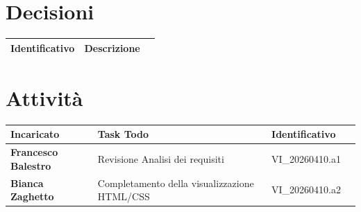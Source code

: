 \documentclass[a4paper,12pt]{article}
\begin{document}
\section{Decisioni} {
        \begin{tabularx}{\textwidth}{|l|X|l|}
            \hline
            \textbf{Identificativo} & \textbf{Descrizione}\\
            \hline
        \end{tabularx}
    }

\section{Attività} {
        \begin{tabularx}{\textwidth}{|l|X|l|l|}
            \hline
            \textbf{Incaricato} & \textbf{Task Todo} & \textbf{Identificativo} \\
            \hline
            \textbf{Francesco Balestro} & Revisione Analisi dei requisiti & VI\_20260410.a1 \\
            \hline
            \textbf{Bianca Zaghetto} & Completamento della visualizzazione HTML/CSS & VI\_20260410.a2 \\
            \hline
        \end{tabularx}
}
\end{document}
